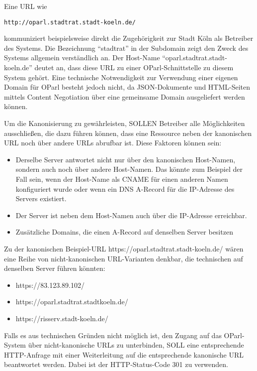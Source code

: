 \documentclass[,a4paper]{article}
\begin{document}
Eine URL wie

\begin{verbatim}
http://oparl.stadtrat.stadt-koeln.de/
\end{verbatim}

kommuniziert beispielsweise direkt die Zugehörigkeit zur Stadt Köln als
Betreiber des Systems. Die Bezeichnung ``stadtrat'' in der Subdomain
zeigt den Zweck des Systems allgemein verständlich an. Der Host-Name
``oparl.stadtrat.stadt-koeln.de'' deutet an, dass diese URL zu einer
OParl-Schnittstelle zu diesem System gehört. Eine technische
Notwendigkeit zur Verwendung einer eigenen Domain für OParl besteht
jedoch nicht, da JSON-Dokumente und HTML-Seiten mittels Content
Negotiation über eine gemeinsame Domain ausgeliefert werden können.

Um die Kanonisierung zu gewährleisten, SOLLEN Betreiber alle
Möglichkeiten ausschließen, die dazu führen können, dass eine Ressource
neben der kanonischen URL noch über andere URLs abrufbar ist. Diese
Faktoren können sein:

\begin{itemize}
\item
  Derselbe Server antwortet nicht nur über den kanonischen Host-Namen,
  sondern auch noch über andere Host-Namen. Das könnte zum Beispiel der
  Fall sein, wenn der Host-Name als CNAME für einen anderen Namen
  konfiguriert wurde oder wenn ein DNS A-Record für die IP-Adresse des
  Servers existiert.
\item
  Der Server ist neben dem Host-Namen auch über die IP-Adresse
  erreichbar.
\item
  Zusätzliche Domains, die einen A-Record auf denselben Server besitzen
\end{itemize}

Zu der kanonischen Beispiel-URL https://oparl.stadtrat.stadt-koeln.de/
wären eine Reihe von nicht-kanonischen URL-Varianten denkbar, die
technischen auf denselben Server führen könnten:

\begin{itemize}
\itemsep1pt\parskip0pt
\item
  https://83.123.89.102/
\item
  https://oparl.stadtrat.stadtkoeln.de/
\item
  https://risserv.stadt-koeln.de/
\end{itemize}

Falls es aus technischen Gründen nicht möglich ist, den Zugang auf das
OParl-System über nicht-kanonische URLs zu unterbinden, SOLL eine
entsprechende HTTP-Anfrage mit einer Weiterleitung auf die entsprechende
kanonische URL beantwortet werden. Dabei ist der HTTP-Status-Code 301 zu
verwenden.
\end{document}
